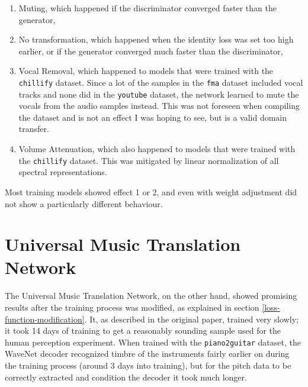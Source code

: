 \documentclass[12pt,a4paper,]{report}
\providecommand{\tightlist}{%
  \setlength{\itemsep}{0pt}\setlength{\parskip}{0pt}}
\begin{document}
\begin{enumerate}
\def\labelenumi{\arabic{enumi}.}
\tightlist
\item
  Muting, which happened if the discriminator converged faster than the
  generator,
\item
  No transformation, which happened when the identity loss was set too
  high earlier, or if the generator converged much faster than the
  discriminator,
\item
  Vocal Removal, which happened to models that were trained with the
  \texttt{chillify} dataset. Since a lot of the samples in the
  \texttt{fma} dataset included vocal tracks and none did in the
  \texttt{youtube} dataset, the network learned to mute the vocals from
  the audio samples instead. This was not foreseen when compiling the
  dataset and is not an effect I was hoping to see, but is a valid
  domain transfer.
\item
  Volume Attenuation, which also happened to models that were trained
  with the \texttt{chillify} dataset. This was mitigated by linear
  normalization of all spectral representations.
\end{enumerate}

Most training models showed effect 1 or 2, and even with weight
adjustment did not show a particularly different behaviour.

\hypertarget{universal-music-translation-network-2}{%
\section{Universal Music Translation
Network}\label{universal-music-translation-network-2}}

The Universal Music Translation Network, on the other hand, showed
promising results after the training process was modified, as explained
in section \ref{loss-function-modification}. It, as described in the
original paper, trained very slowly; it took 14 days of training to get
a reasonably sounding sample used for the human perception experiment.
When trained with the \texttt{piano2guitar} dataset, the WaveNet decoder
recognized timbre of the instruments fairly earlier on during the
training process (around 3 days into training), but for the pitch data
to be correctly extracted and condition the decoder it took much longer.
\end{document}
